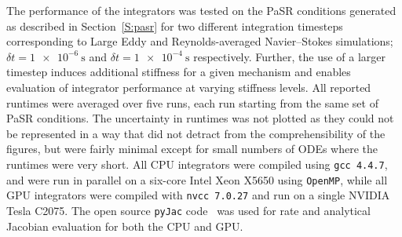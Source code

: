 \documentclass[preprint]{elsarticle}
\begin{document}
The performance of the integrators was tested on the PaSR conditions generated as described in Section~\ref{S:pasr} for two different integration timesteps corresponding to Large Eddy and Reynolds-averaged Navier--Stokes simulations; $\delta t = \SI{1e-6}{\s}$ and $\delta t = \SI{1e-4}{\s}$ respectively.
Further, the use of a larger timestep induces additional stiffness for a given mechanism and enables evaluation of integrator performance at varying stiffness levels.
All reported runtimes were averaged over five runs, each run starting from the same set of PaSR conditions.
The uncertainty in runtimes was not plotted as they could not be represented in a way that did not detract from the comprehensibility of the figures, but were fairly minimal except for small numbers of ODEs where the runtimes were very short.
All CPU integrators were compiled using \texttt{gcc 4.4.7}, and were run in parallel on a six-core Intel Xeon X5650 using \texttt{OpenMP}, while all GPU integrators were compiled with \texttt{nvcc 7.0.27} and run on a single NVIDIA Tesla C2075.
The open source \texttt{pyJac} code~\cite{Niemeyer:2015im,Niemeyer:2015ws} was used for rate and analytical Jacobian evaluation for both the CPU and GPU.
\end{document}
